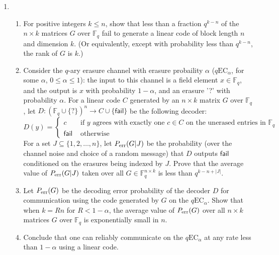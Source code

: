 \documentclass[11pt]{article}
\newcommand{\F}{{\mathbb F}}
\begin{document}
\begin{enumerate}
\item 
\begin{enumerate}
\item For positive integers $k \le n$, show that less than a fraction
  $q^{k-n}$ of the $n \times k$ matrices $G$ over $\F_q$
  fail to generate a linear code of block length $n$ and dimension
  $k$. (Or equivalently, except with probability less than $q^{k-n}$, the rank of
  $G$ is $k$.)
\item 
Consider the $q$-ary erasure channel with erasure probaility
  $\alpha$ ($q\mbox{EC}_\alpha$, for some $\alpha$, $0 \le \alpha \le 1$): the input to this channel is a field element $x \in \F_q$,
  and the output is $x$ with probability $1-\alpha$, and an erasure
  '?' with probability $\alpha$.  For a linear code $C$ generated by an
  $n \times k$ matrix $G$ over
  $\F_q$, let $D : (\F_q \cup \{?\})^n \rightarrow C \cup
  \{\mathsf{fail}\}$ be the following decoder:
\[ D(y) = \left\{ \begin{array}{ll}
 c & \mbox{ if $y$ agrees with exactly one $c \in C$ on the unerased
 entries in $\F_q$} \\
\mathsf{fail} & \mbox{ otherwise} 
\end{array}
\right. \]
For a set $J \subseteq \{1,2,\dots,n\}$, let $P_{\rm err}(G|J)$ be the
probability (over the channel noise and choice of a random message) that $D$ outputs $\mathsf{fail}$ conditioned on the
erasures being indexed by $J$. Prove that the average value of $P_{\rm
  err}(G|J)$ taken over all $G \in \F_q^{n \times k}$ is less than
$q^{k-n+|J|}$. 
\item 
Let $P_{\rm err}(G)$ be the decoding error probability of the
  decoder $D$ for communication using the code generated by $G$ on the
  $q\mbox{EC}_\alpha$. Show that when $k = Rn$ for $R < 1-\alpha$, the
  average value of $P_{\rm err}(G)$ over all $n \times k$ matrices $G$
  over $\F_q$ is exponentially small in $n$.
\item Conclude that one can reliably communicate on the
  $q\mbox{EC}_\alpha$ at any rate less than $1 - \alpha$ using a
  linear code.
\end{enumerate}



\end{enumerate}
\end{document}
